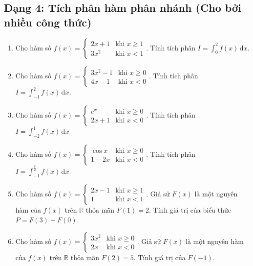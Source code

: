 \documentclass[12pt]{article}
\begin{document}
	\subsection{Dạng 4: Tích phân hàm phân nhánh (Cho bởi nhiều công thức)}
	\begin{btxanh}
		\begin{enumerate}[label=\alph*)]
			\item Cho hàm số $f(x) = \begin{cases} 2x + 1 & \text{khi } x \ge 1 \\ 3x^2 & \text{khi } x < 1 \end{cases}$. Tính tích phân $I = \displaystyle \int_0^2 f(x)\,\mathrm{d}x$.
			\item Cho hàm số $f(x) = \begin{cases} 3x^2 - 1 & \text{khi } x \ge 0 \\ 4x - 1 & \text{khi } x < 0 \end{cases}$. Tính tích phân $I = \displaystyle \int_{-1}^2 f(x)\,\mathrm{d}x$.
			\item Cho hàm số $f(x) = \begin{cases} e^x & \text{khi } x \ge 0 \\ 2x + 1 & \text{khi } x < 0 \end{cases}$. Tính tích phân $I = \displaystyle \int_{-2}^1 f(x)\,\mathrm{d}x$.
			\item Cho hàm số $f(x) = \begin{cases} \cos x & \text{khi } x \ge 0 \\ 1 - 2x & \text{khi } x < 0 \end{cases}$. Tính tích phân $I = \displaystyle \int_{-1}^{\frac{\pi}{2}} f(x)\,\mathrm{d}x$.
			\item Cho hàm số $f(x) = \begin{cases} 2x - 1 & \text{khi } x \ge 1 \\ 1 & \text{khi } x < 1 \end{cases}$. Giả sử $F(x)$ là một nguyên hàm của $f(x)$ trên $\mathbb{R}$ thỏa mãn $F(1) = 2$. Tính giá trị của biểu thức $P = F(3) + F(0)$.
			\item Cho hàm số $f(x) = \begin{cases} 3x^2 & \text{khi } x \ge 0 \\ 2x & \text{khi } x < 0 \end{cases}$. Giả sử $F(x)$ là một nguyên hàm của $f(x)$ trên $\mathbb{R}$ thỏa mãn $F(2) = 5$. Tính giá trị của $F(-1)$.
		\end{enumerate}
	\end{btxanh}
	
\end{document}
